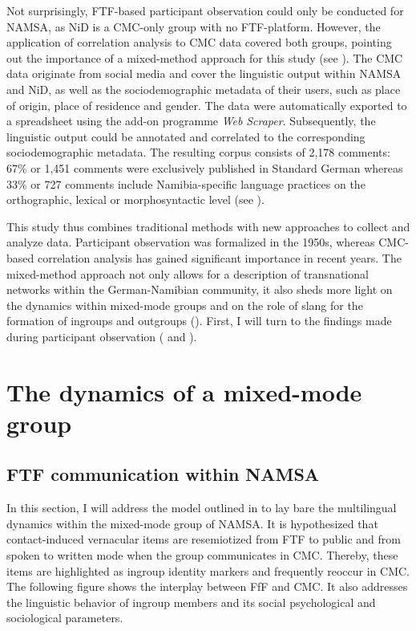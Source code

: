 \documentclass[output=paper]{langsci/langscibook}
\begin{document}
Not surprisingly, FTF-based participant observation could only be conducted for NAMSA, as NiD is a CMC-only group with no FTF-platform. However, the application of correlation analysis to CMC data covered both groups, pointing out the importance of a mixed-method approach for this study (see ). The CMC data originate from social media and cover the linguistic output within NAMSA and NiD, as well as the sociodemographic metadata of their users, such as place of origin, place of residence and gender. The data were automatically exported to a spreadsheet using the add-on programme \textit{Web} \textit{Scraper}. Subsequently, the linguistic output could be annotated and correlated to the corresponding sociodemographic metadata. The resulting corpus consists of 2,178 comments: 67\% or 1,451 comments were exclusively published in Standard German whereas 33\% or 727 comments include Namibia-specific language practices on the orthographic, lexical or morphosyntactic level (see \citealt{radke_urban_inpress}).

\begin{sloppypar}
This study thus combines traditional methods with new approaches to collect and analyze data. Participant observation was formalized in the 1950s, whereas CMC-based correlation analysis has gained significant importance in recent years. The mixed-method approach not only allows for a description of transnational networks within the German-Namibian community, it also sheds more light on the dynamics within mixed-mode groups and on the role of slang for the formation of ingroups and outgroups (). First, I will turn to the findings made during participant observation ( and ). 
\end{sloppypar}

 
 \section{The dynamics of a mixed-mode group} 
 \label{sec:radke:3}

 
\subsection{FTF communication within NAMSA}
 \label{sec:radke:3.1}
 

In this section, I will address the model outlined in  to lay bare the multilingual dynamics within the mixed-mode group of NAMSA. It is hypothesized that contact-induced vernacular items are resemiotized from FTF to public and from spoken to written mode when the group communicates in CMC. Thereby, these items are highlighted as ingroup identity markers and frequently reoccur in CMC. The following figure shows the interplay between FfF and CMC. It also addresses the linguistic behavior of ingroup members and its social psychological and sociological parameters. 
\end{document}
